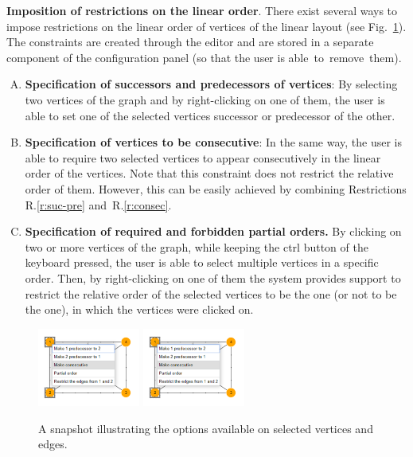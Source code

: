 \documentclass[runningheads]{llncs}
\newcommand{\myparagraph}[1]{\medskip\noindent\textbf{#1}.}
\begin{document}
\myparagraph{Imposition of restrictions on the linear order} There exist several ways to impose restrictions on the linear order of vertices of the linear layout (see Fig.~\ref{fig:options}). The constraints are created through the  editor and are stored in a separate component of the configuration panel (so that the user is able~to~remove~them). 

\begin{enumerate}[R.1]
\item \label{r:suc-pre} \textbf{Specification of successors and predecessors of vertices}: By selecting two vertices of the graph and by right-clicking on one of them, the user is able to set one of the selected vertices successor or predecessor of the other.
\item \label{r:consec} \textbf{Specification of vertices to be consecutive}: In the same way, the user is able to require two selected vertices to appear consecutively in the linear order of the vertices. Note that this constraint does not restrict the relative order of them. However, this can be easily achieved by combining Restrictions R.\ref{r:suc-pre} and~R.\ref{r:consec}. 
\item \label{r:order} \textbf{Specification of required and forbidden partial orders.}  By clicking on two or more vertices of the graph, while keeping the ctrl button of the keyboard pressed, the user is able to select multiple vertices in a specific order. Then, by right-clicking on one of them the system provides support to restrict the relative order of the selected vertices to be the one (or not to be the one), in which the vertices were clicked on. 
\end{enumerate}
%
\begin{figure}[t]
	\centering
	\includegraphics[width=0.3\textwidth,page=1]{options}
	\hfil
	\includegraphics[width=0.3\textwidth,page=2]{options}
   \caption{%
   A snapshot illustrating the options available on selected    
   vertices and edges.}
\label{fig:options}
\end{figure}
\end{document}

